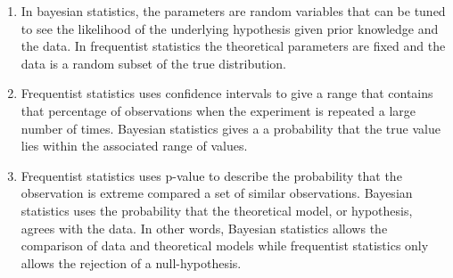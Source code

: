 \documentclass[12pt]{article}
\begin{document}
\begin{enumerate}
    \item In bayesian statistics, the parameters are random variables that can be tuned to see the likelihood of the underlying hypothesis given prior knowledge and the data. In frequentist statistics the theoretical parameters are fixed and the data is a random subset of the true distribution.
    \item Frequentist statistics uses confidence intervals to give a range that contains that percentage of observations when the experiment is repeated a large number of times. Bayesian statistics gives a a probability that the true value lies within the associated range of values.
    \item Frequentist statistics uses p-value to describe the probability that the observation is extreme compared a set of similar observations. Bayesian statistics uses the probability that the theoretical model, or hypothesis, agrees with the data. In other words, Bayesian statistics allows the comparison of data and theoretical models while frequentist statistics only allows the rejection of a null-hypothesis.
\end{enumerate}



\end{document}
